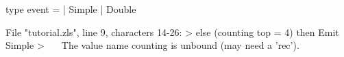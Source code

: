 \runverbatimfalse
{}
\begin{RunVerbatimMsg}
type event   =  | Simple  | Double
\end{RunVerbatimMsg}
\begin{RunVerbatimErr}
File "tutorial.zls", line 9, characters 14-26:
>        else (counting top = 4) then Emit Simple
>              ^^^^^^^^^^^^
The value name counting is unbound (may need a 'rec').
\end{RunVerbatimErr}

